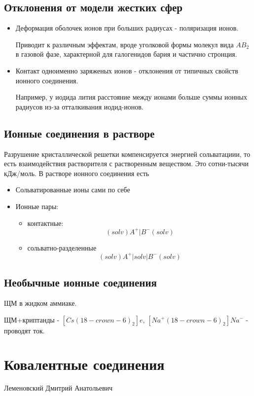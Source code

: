 \documentclass[11pt]{article}
\begin{document}
\subsection*{Отклонения от модели жестких сфер}
\begin{itemize}
\item Деформация оболочек ионов при больших радиусах - поляризация ионов.

Приводит к различным эффектам, вроде уголковой формы молекул вида $AB_2$ в газовой фазе, характерной для галогенидов бария и частично стронция.
\item Контакт одноименно заряженых ионов - отклонения от типичных свойств ионного соединения.

Например, у иодида лития расстояние между ионами больше суммы ионных радиусов из-за отталкивания иодид-ионов.
\end{itemize}

\subsection*{Ионные соединения в растворе}

Разрушение кристаллической решетки компенсируется энергией сольватациии, то есть взаимодействия растворителя с растворенным веществом. Это сотни-тысячи кДж/моль.
В растворе ионного соединения есть
\begin{itemize}
\item Сольватированные ионы сами по себе
\item Ионные пары:
\begin{itemize}
\item контактные:
$$(solv)A^+|B^-(solv)$$
\item сольватно-разделенные
$$(solv)A^+|solv|B^-(solv)$$
\end{itemize}
\end{itemize}

\subsection*{Необычные ионные соединения}

ЩМ в жидком аммиаке.

ЩМ+криптанды - $[Cs(18-crown-6)_2]e$, $[Na^+(18-crown-6)_2]Na^-$ - проводят ток.
\section*{Ковалентные соединения}

Леменовский Дмитрий Анатольевич
\end{document}
